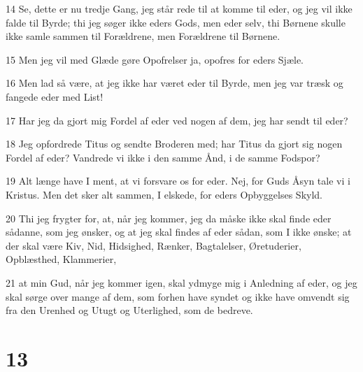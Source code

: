 \par 14 Se, dette er nu tredje Gang, jeg står rede til at komme til eder, og jeg vil ikke falde til Byrde; thi jeg søger ikke eders Gods, men eder selv, thi Børnene skulle ikke samle sammen til Forældrene, men Forældrene til Børnene.
\par 15 Men jeg vil med Glæde gøre Opofrelser ja, opofres for eders Sjæle.
\par 16 Men lad så være, at jeg ikke har været eder til Byrde, men jeg var træsk og fangede eder med List!
\par 17 Har jeg da gjort mig Fordel af eder ved nogen af dem, jeg har sendt til eder?
\par 18 Jeg opfordrede Titus og sendte Broderen med; har Titus da gjort sig nogen Fordel af eder? Vandrede vi ikke i den samme Ånd, i de samme Fodspor?
\par 19 Alt længe have I ment, at vi forsvare os for eder. Nej, for Guds Åsyn tale vi i Kristus. Men det sker alt sammen, I elskede, for eders Opbyggelses Skyld.
\par 20 Thi jeg frygter for, at, når jeg kommer, jeg da måske ikke skal finde eder sådanne, som jeg ønsker, og at jeg skal findes af eder sådan, som I ikke ønske; at der skal være Kiv, Nid, Hidsighed, Rænker, Bagtalelser, Øretuderier, Opblæsthed, Klammerier,
\par 21 at min Gud, når jeg kommer igen, skal ydmyge mig i Anledning af eder, og jeg skal sørge over mange af dem, som forhen have syndet og ikke have omvendt sig fra den Urenhed og Utugt og Uterlighed, som de bedreve.

\chapter{13}

